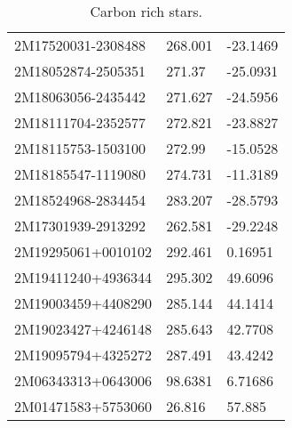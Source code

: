 \documentclass[fleqn,usenatbib]{mnras}
\begin{document}
\begin{table}
\begin{tabular}{lll}
2M17520031-2308488 &  268.001 & -23.1469 \\
2M18052874-2505351 &   271.37 & -25.0931 \\
2M18063056-2435442 &  271.627 & -24.5956 \\
2M18111704-2352577 &  272.821 & -23.8827 \\
2M18115753-1503100 &   272.99 & -15.0528 \\
2M18185547-1119080 &  274.731 & -11.3189 \\
2M18524968-2834454 &  283.207 & -28.5793 \\
2M17301939-2913292 &  262.581 & -29.2248 \\
2M19295061+0010102 &  292.461 &  0.16951 \\
2M19411240+4936344 &  295.302 &  49.6096 \\
2M19003459+4408290 &  285.144 &  44.1414 \\
2M19023427+4246148 &  285.643 &  42.7708 \\
2M19095794+4325272 &  287.491 &  43.4242 \\
2M06343313+0643006 &  98.6381 &  6.71686 \\
2M01471583+5753060 &   26.816 &   57.885 \\
  \bottomrule
  \end{tabular}
  \caption{Carbon rich stars.}
  \label{tab:carbon}
\end{table}
\end{document}
